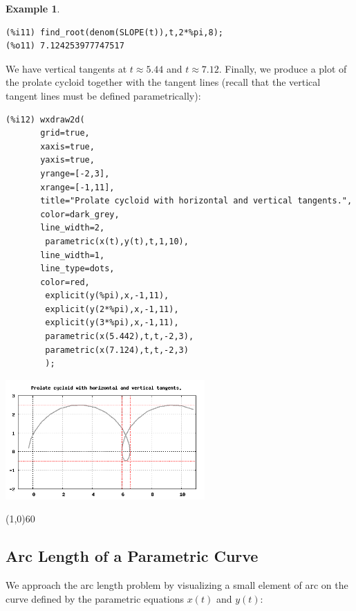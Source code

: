 \documentclass[10.5pt,twoside]{report}
\theoremstyle{definition}
\newtheorem{exmp}{Example}[section]
\begin{document}
\begin{exmp}
\begin{verbatim}
(%i11) find_root(denom(SLOPE(t)),t,2*%pi,8);
(%o11) 7.124253977747517
\end{verbatim}

We have vertical tangents at $t\approx 5.44$ and $t\approx 7.12$.  Finally, we produce a plot of the prolate cycloid together with the tangent lines (recall that the vertical tangent lines must be defined parametrically):

\begin{verbatim}
(%i12) wxdraw2d(
       grid=true,
       xaxis=true,
       yaxis=true,
       yrange=[-2,3],
       xrange=[-1,11],
       title="Prolate cycloid with horizontal and vertical tangents.",
       color=dark_grey,
       line_width=2,
        parametric(x(t),y(t),t,1,10),
       line_width=1,
       line_type=dots,
       color=red,
        explicit(y(%pi),x,-1,11),
        explicit(y(2*%pi),x,-1,11),
        explicit(y(3*%pi),x,-1,11),
        parametric(x(5.442),t,t,-2,3),
        parametric(x(7.124),t,t,-2,3)
        );
\end{verbatim}


\includegraphics[width=3in]{example_5_2_2_2}


\end{exmp}

\line(1,0){60}
\linethickness{0.5mm}


\subsection{Arc Length of a Parametric Curve}

We approach the arc length problem by visualizing a small element of arc on the curve defined by the parametric equations $x(t)$ and $y(t)$:

${}$\\
\end{document}
